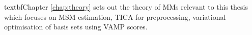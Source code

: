 textbf{Chapter \ref{chap:theory}} sets out the theory of MMs relevant to this thesis which focuses on MSM estimation, TICA for preprocessing, variational optimisation of basis sets using VAMP scores. 




